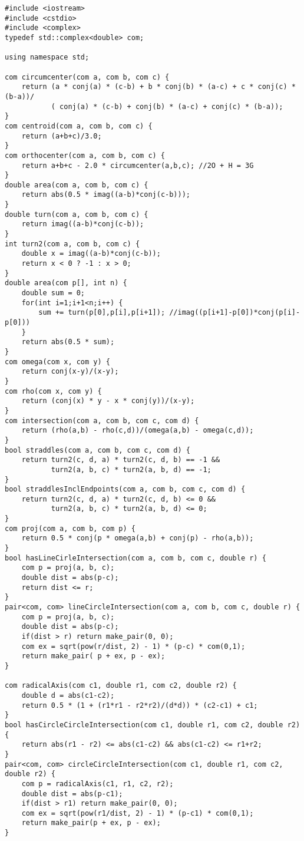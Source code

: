 \begin{lstlisting}
#include <iostream>
#include <cstdio>
#include <complex>
typedef std::complex<double> com;

using namespace std;

com circumcenter(com a, com b, com c) {
    return (a * conj(a) * (c-b) + b * conj(b) * (a-c) + c * conj(c) * (b-a))/
           ( conj(a) * (c-b) + conj(b) * (a-c) + conj(c) * (b-a));
}
com centroid(com a, com b, com c) {
    return (a+b+c)/3.0;
}
com orthocenter(com a, com b, com c) {
    return a+b+c - 2.0 * circumcenter(a,b,c); //2O + H = 3G
}
double area(com a, com b, com c) {
    return abs(0.5 * imag((a-b)*conj(c-b)));
}
double turn(com a, com b, com c) {
    return imag((a-b)*conj(c-b));
}
int turn2(com a, com b, com c) {
    double x = imag((a-b)*conj(c-b));
    return x < 0 ? -1 : x > 0;
}
double area(com p[], int n) {
    double sum = 0;
    for(int i=1;i+1<n;i++) {
        sum += turn(p[0],p[i],p[i+1]); //imag((p[i+1]-p[0])*conj(p[i]-p[0]))
    }
    return abs(0.5 * sum);
}
com omega(com x, com y) {
    return conj(x-y)/(x-y);
}
com rho(com x, com y) {
    return (conj(x) * y - x * conj(y))/(x-y);
}
com intersection(com a, com b, com c, com d) {
    return (rho(a,b) - rho(c,d))/(omega(a,b) - omega(c,d));
}
bool straddles(com a, com b, com c, com d) {
    return turn2(c, d, a) * turn2(c, d, b) == -1 &&
           turn2(a, b, c) * turn2(a, b, d) == -1;
}
bool straddlesInclEndpoints(com a, com b, com c, com d) {
    return turn2(c, d, a) * turn2(c, d, b) <= 0 &&
           turn2(a, b, c) * turn2(a, b, d) <= 0;
}
com proj(com a, com b, com p) {
    return 0.5 * conj(p * omega(a,b) + conj(p) - rho(a,b));
}
bool hasLineCirleIntersection(com a, com b, com c, double r) {
    com p = proj(a, b, c);
    double dist = abs(p-c);
    return dist <= r;
}
pair<com, com> lineCircleIntersection(com a, com b, com c, double r) {
    com p = proj(a, b, c);
    double dist = abs(p-c);
    if(dist > r) return make_pair(0, 0);
    com ex = sqrt(pow(r/dist, 2) - 1) * (p-c) * com(0,1);
    return make_pair( p + ex, p - ex);
}

com radicalAxis(com c1, double r1, com c2, double r2) {
    double d = abs(c1-c2);
    return 0.5 * (1 + (r1*r1 - r2*r2)/(d*d)) * (c2-c1) + c1;
}
bool hasCircleCircleIntersection(com c1, double r1, com c2, double r2) {
    return abs(r1 - r2) <= abs(c1-c2) && abs(c1-c2) <= r1+r2;
}
pair<com, com> circleCircleIntersection(com c1, double r1, com c2, double r2) {
    com p = radicalAxis(c1, r1, c2, r2);
    double dist = abs(p-c1);
    if(dist > r1) return make_pair(0, 0);
    com ex = sqrt(pow(r1/dist, 2) - 1) * (p-c1) * com(0,1);
    return make_pair(p + ex, p - ex);
}


\end{lstlisting}
